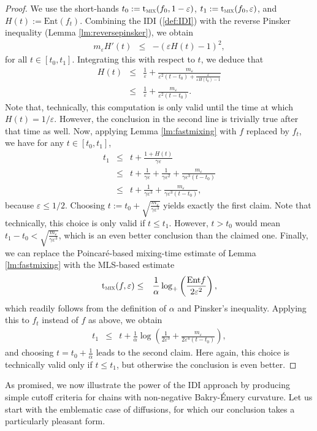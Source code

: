 \documentclass[12pt,final]{article}
\numberwithin{equation}{section}
\newcommand{\Ent}{\mathrm{Ent}}
\newcommand{\tmix}{{\rm t}_{\textsc{mix}}}
\begin{document}
\begin{proof}We use the short-hands $t_0:=\tmix(f_0,1-\varepsilon)$,  $t_1:=\tmix(f_0,\varepsilon)$, and $H(t):=\Ent(f_t)$. Combining the IDI (\ref{def:IDI}) with the reverse Pinsker inequality  (Lemma \ref{lm:reversepinsker}), we obtain 
\begin{eqnarray*}
m_\varepsilon H'(t) & \le & -\left(\varepsilon H(t)-1\right)^2, 
\end{eqnarray*}
for all  $t\in[t_0,t_1]$. Integrating this with respect to $t$, we deduce that
\begin{eqnarray*}
H(t)  & \le & \frac{1}{\varepsilon}+\frac{m_\varepsilon}{\varepsilon^2(t-t_0) +\frac{\varepsilon}{\varepsilon H(t_0)-1}}\\& \le &
\frac{1}{\varepsilon}+\frac{m_\varepsilon}{\varepsilon^2(t-t_0)}.
\end{eqnarray*}
Note that, technically, this computation is only valid  until the time at which $H(t)=1/\varepsilon$. However, the conclusion in the second line is trivially true after that time as well. Now, applying Lemma \ref{lm:fastmixing} with $f$ replaced by $f_t$, we have for any $t\in[t_0,t_1]$,
\begin{eqnarray*}
t_1 & \le & t+\frac{1+H(t)}{\gamma \varepsilon}\\
& \le & t+\frac{1}{\gamma\varepsilon}+\frac{1}{\gamma\varepsilon^2}+\frac{m_\varepsilon}{\gamma \varepsilon^3(t-t_0)}\\
& \le & t+\frac{1}{\gamma\varepsilon^3}+\frac{m_\varepsilon}{\gamma \varepsilon^3(t-t_0)},
\end{eqnarray*}
because $\varepsilon\le 1/2$. Choosing $t:=t_0+\sqrt{\frac{m_\varepsilon}{\gamma \varepsilon^3}}$ yields exactly the first claim. Note that technically, this choice is only valid if $t\le t_1$. However, $t>t_0$ would mean $t_1-t_0<\sqrt{\frac{m_\varepsilon}{\gamma \varepsilon^3}}$, which is an even better conclusion than the claimed one. Finally, we  can replace the Poincaré-based mixing-time estimate of Lemma \ref{lm:fastmixing} with the MLS-based estimate
\begin{eqnarray*}
\tmix(f,\varepsilon) & \le & \frac{1}{\alpha}\log_+\left(\frac{\Ent f}{2\varepsilon^2}\right),
\end{eqnarray*}
which readily follows from the definition of $\alpha$  and Pinsker's inequality. Applying this to $f_t$ instead of $f$ as above, we obtain
\begin{eqnarray*}
t_1 & \le & t+\frac{1}{\alpha}\log\left(\frac{1}{2\varepsilon^3}+\frac{m_\varepsilon}{2\varepsilon^4(t-t_0)}\right),
\end{eqnarray*}
and choosing $t=t_0+\frac{1}{\alpha}$ leads to the second claim. Here again, this choice is technically valid only if $t\le t_1$, but otherwise the conclusion is even better.
\end{proof}
As promised, we  now illustrate the power of the IDI approach by producing simple cutoff criteria for chains with non-negative Bakry-\'Emery curvature. Let us start with the emblematic case of diffusions, for which our conclusion takes a particularly pleasant form.
\end{document}
